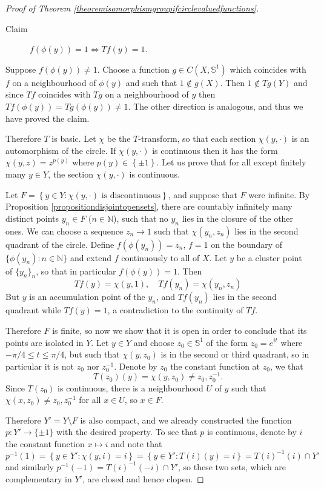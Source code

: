 \documentclass[letter,11pt]{amsart}
\theoremstyle{plain}		\newtheorem{theorem}[generalnumbering]{Theorem}
\theoremstyle{plain}		\newtheorem{corollary}[generalnumbering]{Corollary}
\theoremstyle{definition}		\newtheorem{definition}[generalnumbering]{Definition}
\theoremstyle{definition}		\newtheorem{example}[generalnumbering]{Example}
\theoremstyle{plain}		\newtheorem{proposition}[generalnumbering]{Proposition}
\theoremstyle{plain}		\newtheorem{lemma}[generalnumbering]{Lemma}
\theoremstyle{definition}
\begin{document}
\begin{proof}[Proof of Theorem \ref{theoremisomorphismgroupifcirclevaluedfunctions}]
	\begin{description}
		\item[Claim] $f(\phi(y))=1\iff Tf(y)=1$.
	\end{description}
	
	Suppose $f(\phi(y))\neq 1$. Choose a function $g\in C(X,\mathbb{S}^1)$ which coincides with $f$ on a neighbourhood of $\phi(y)$ and such that $1\not\in g(X)$. Then $1\not\in Tg(Y)$ and since $Tf$ coincides with $Tg$ on a neighbourhood of $y$ then $Tf(\phi(y))=Tg(\phi(y))\neq 1$. The other direction is analogous, and thus we have proved the claim.
	
	Therefore $T$ is basic. Let $\chi$ be the $T$-transform, so that each section $\chi(y,\cdot)$ is an automorphism of the circle. If $\chi(y,\cdot)$ is continuous then it has the form $\chi(y,z)=z^{p(y)}$ where $p(y)\in\left\{\pm1\right\}$. Let us prove that for all except finitely many $y\in Y$, the section $\chi(y,\cdot)$ is continuous.
	
	Let $F=\left\{y\in Y:\chi(y,\cdot)\text{ is discontinuous}\right\}$, and suppose that $F$ were infinite. By Proposition \ref{propositiondisjointopensets}, there are countably infinitely many distinct points $y_n\in F$ ($n\in\mathbb{N}$), such that no $y_n$ lies in the closure of the other ones. We can choose a sequence $z_n\to 1$ such that $\chi(y_n,z_n)$ lies in the second quadrant of the circle. Define $f(\phi(y_n))=z_n$, $f=1$ on the boundary of $\{\phi(y_n):n\in\mathbb{N}\}$ and extend $f$ continuously to all of $X$. Let $y$ be a cluster point of $\{y_n\}_n$, so that in particular $f(\phi(y))=1$. Then
	\[Tf(y)=\chi(y,1),\quad Tf(y_n)=\chi(y_n,z_n)\]
	But $y$ is an accumulation point of the $y_n$, and $Tf(y_n)$ lies in the second quadrant while $Tf(y)=1$, a contradiction to the continuity of $Tf$.
	
	Therefore $F$ is finite, so now we show that it is open in order to conclude that its points are isolated in $Y$. Let $y\in Y$ and choose $z_0\in\mathbb{S}^1$ of the form $z_0=e^{it}$ where $-\pi/4\leq t\leq \pi/4$, but such that $\chi(y,z_0)$ is in the second or third quadrant, so in particular it is not $z_0$ nor $z_0^{-1}$. Denote by $z_0$ the constant function at $z_0$, we that
	\[T(z_0)(y)=\chi(y,z_0)\neq z_0,z_0^{-1}.\]
	Since $T(z_0)$ is continuous, there is a neighbourhood $U$ of $y$ such that $\chi(x,z_0)\neq z_0,z_0^{-1}$ for all $x\in U$, so $x\in F$.
	
	Therefore $Y'=Y\setminus F$ is also compact, and we already constructed the function $p\colon Y'\to\{\pm 1\}$ with the desired property. To see that $p$ is continuous, denote by $i$ the constant function $x\mapsto i$ and note that
	\[p^{-1}(1)=\left\{y\in Y':\chi(y,i)=i\right\}=\left\{y\in Y':T(i)(y)=i\right\}=T(i)^{-1}(i)\cap Y'\]
	and similarly $p^{-1}(-1)=T(i)^{-1}(-i)\cap Y'$, so these two sets, which are complementary in $Y'$, are closed and hence clopen.
\end{proof}
\end{document}
